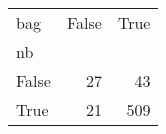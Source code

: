 \begin{tabular}{lrr}
\toprule
bag &  False &  True  \\
nb    &        &        \\
\midrule
False &     27 &     43 \\
True  &     21 &    509 \\
\bottomrule
\end{tabular}
